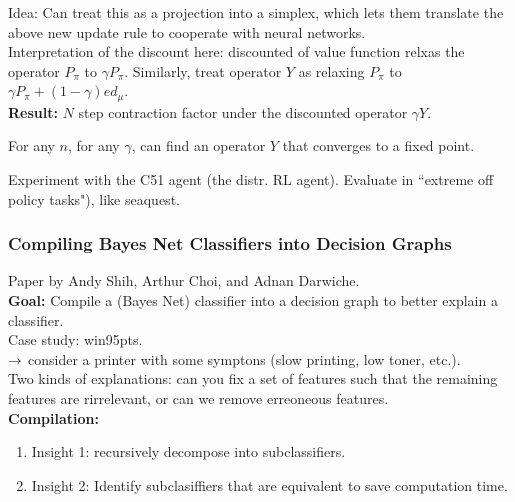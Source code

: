 Idea: Can treat this as a projection into a simplex, which lets them translate the above new update rule to cooperate with neural networks. \\

Interpretation of the discount here: discounted of value function relxas the operator $P_\pi$ to $\gamma P_\pi$. Similarly, treat operator $Y$ as relaxing $P_\pi$ to $\gamma P_\pi + (1-\gamma) ed_\mu$. \\

{\bf Result:} $N$ step contraction factor under the discounted operator $\gamma Y$. 

\begin{theorem}
For any $n$, for any $\gamma$, can find an operator $Y$ that converges to a fixed point.
\end{theorem}

Experiment with the C51 agent (the distr. RL agent). Evaluate in ``extreme off policy tasks"), like seaquest. \\





\spacerule
\subsubsection{Compiling Bayes Net Classifiers into Decision Graphs~\cite{shih2019compiling}}

Paper by Andy Shih, Arthur Choi, and Adnan Darwiche. \\

{\bf Goal:} Compile a (Bayes Net) classifier into a decision graph to better explain a classifier. \\


Case study: win95pts. \\

$\rightarrow$ consider a printer with some symptons (slow printing, low toner, etc.). \\

Two kinds of explanations: can you fix a set of features such that the remaining features are rirrelevant, or can we remove erreoneous features. \\

{\bf Compilation:}
\begin{enumerate}
    \item Insight 1: recursively decompose into subclassifiers.
    \item Insight 2: Identify subclasiffiers that are equivalent to save computation time.
\end{enumerate}

